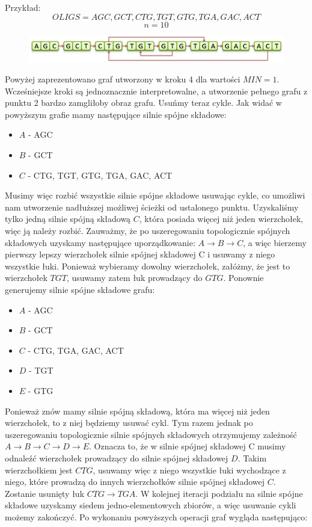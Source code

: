 \documentclass[a4paper,10pt]{article}
\begin{document}
Przykład:
$$OLIGS = { AGC, GCT, CTG, TGT, GTG, TGA, GAC, ACT }$$
$$n = 10$$

\begin{figure}[h]
  \footnotesize\centering
  \includegraphics[width=\textwidth,keepaspectratio]{Graph1.png}
\end{figure}

Powyżej zaprezentowano graf utworzony w kroku 4 dla wartości $MIN=1$. Wcześniejsze kroki są jednoznacznie interpretowalne, a utworzenie pełnego grafu z punktu 2 bardzo zamgliłoby obraz grafu. Usuńmy teraz cykle.
Jak widać w powyższym grafie mamy następujące silnie spójne składowe:
\begin{itemize}
 \item $A$ - {AGC}
 \item $B$ - {GCT}
 \item $C$ - {CTG, TGT, GTG, TGA, GAC, ACT}
\end{itemize}
Musimy więc rozbić wszystkie silnie spójne składowe usuwając cykle, co umożliwi nam utworzenie nadłuższej możliwej ścieżki od ustalonego punktu.
Uzyskaliśmy tylko jedną silnie spójną składową $C$, która posiada więcej niż jeden wierzchołek, więc ją należy rozbić. 
Zauważmy, że po uszeregowaniu topologicznie spójnych składowych uzyskamy następujące uporządkowanie: $A \rightarrow B \rightarrow C$, 
a więc bierzemy pierwszy lepszy wierzchołek silnie spójnej składowej C i usuwamy z niego wszystkie łuki. 
Ponieważ wybieramy dowolny wierzchołek, załóżmy, że jest to wierzchołek $TGT$, usuwamy zatem łuk prowadzący do $GTG$.
Ponownie generujemy silnie spójne składowe grafu:
\begin{itemize}
 \item $A$ - {AGC}
 \item $B$ - {GCT}
 \item $C$ - {CTG, TGA, GAC, ACT}
 \item $D$ - {TGT}
 \item $E$ - {GTG}
\end{itemize}
Ponieważ znów mamy silnie spójną składową, która ma więcej niż jeden wierzchołek, to z niej będziemy usuwać cykl. 
Tym razem jednak po uszeregowaniu topologicznie silnie spójnych składowych otrzymujemy zależność $A \rightarrow B \rightarrow C \rightarrow D \rightarrow E$. 
Oznacza to, że w silnie spójnej składowej C musimy odnaleźć wierzchołek prowadzący do silnie spójnej składowej $D$. 
Takim wierzchołkiem jest $CTG$, usuwamy więc z niego wszystkie łuki wychodzące z niego, które prowadzą do innych 
wierzchołków silnie spójnej składowej $C$. Zostanie usunięty łuk $CTG \rightarrow TGA$.
W kolejnej iteracji podziału na silnie spójne składowe uzyskamy siedem jedno-elementowych zbiorów, a więc usuwanie 
cykli możemy zakończyć. Po wykonaniu powyższych operacji graf wygląda następująco:
\end{document}

